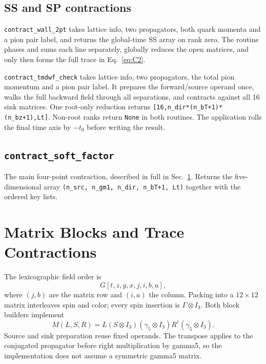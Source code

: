 \documentclass[11pt,a4paper]{article}
\newcommand{\Gfive}{\gamma_{5}}
\newcommand{\walltag}[1]{\texttt{#1}}
\begin{document}
\subsection{SS and SP contractions}

\walltag{contract\_wall\_2pt} takes lattice info, two propagators, both quark
momenta and a pion pair label, and returns the global-time SS array on rank zero.
The routine phases and sums each line separately, globally reduces the open
matrices, and only then forms the full trace in Eq.~\eqref{eq:C2}.

\walltag{contract\_tmdwf\_check} takes lattice info, two propagators, the total
pion momentum and a pion pair label. It prepares the forward/source operand
once, walks the full backward field through all separations, and contracts
against all 16 sink matrices. One root-only reduction returns
\walltag{[16,n\_dir*(n\_bT+1)*(n\_bz+1),Lt]}.
Non-root ranks return \walltag{None} in both routines. The application rolls
the final time axis by $-t_0$ before writing the result.


\subsection{\walltag{contract\_soft\_factor}}

The main four-point contraction, described in full in Sec.~\ref{sec:einsum}.
Returns the five-dimensional array \walltag{(n\_src, n\_gm1, n\_dir, n\_bT+1, Lt)}
together with the ordered key lists.


\section{Matrix Blocks and Trace Contractions}\label{sec:einsum}

The lexicographic field order is
\begin{equation}\label{eq:indices}
G[t,z,y,x,j,i,b,a],
\end{equation}
where $(j,b)$ are the matrix row and $(i,a)$ the column. Packing into a
$12\times12$ matrix interleaves spin and color; every spin insertion is
$\Gamma\otimes I_3$. Both block builders implement
\begin{equation}
M(L,S,R)=L(S\otimes I_3)(\Gfive\otimes I_3)
                  R^\dagger(\Gfive\otimes I_3).
\end{equation}
Source and sink preparation reuse fixed operands. The transpose applies to
the conjugated propagator before right multiplication by gamma5, so the
implementation does not assume a symmetric gamma5 matrix.
\end{document}
